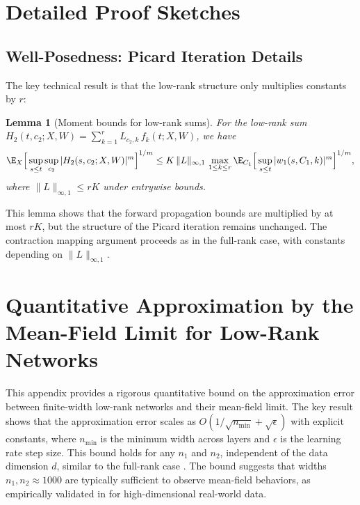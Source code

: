\documentclass[nohyperref]{article}
\theoremstyle{plain}
\newtheorem{lemma}[theorem]{Lemma}
\theoremstyle{definition}
\theoremstyle{remark}
\begin{document}
\section{Detailed Proof Sketches}
\label{app:proofs}


\subsection{Well-Posedness: Picard Iteration Details}
\label{app:picard}


The key technical result is that the low-rank structure only multiplies constants by $r$:

\begin{lemma}[Moment bounds for low-rank sums]
\label{lem:lowrank-moment}
For the low-rank sum $H_2(t,c_2;X,W)=\sum_{k=1}^r L_{c_2,k}\,f_k(t;X,W)$, we have
\[
\E_X\Big[\sup_{s\le t}\sup_{c_2}|H_2(s,c_2;X,W)|^m\Big]^{1/m}
\le K\,\|L\|_{\infty,1}\,\max_{1\le k\le r}\E_{C_1}\Big[\sup_{s\le t}|w_1(s,C_1,k)|^m\Big]^{1/m},
\]
where $\|L\|_{\infty,1}\le rK$ under entrywise bounds.
\end{lemma}

This lemma shows that the forward propagation bounds are multiplied by at most $rK$, but the structure of the Picard iteration remains unchanged. The contraction mapping argument proceeds as in the full-rank case, with constants depending on $\|L\|_{\infty,1}$.








\section{Quantitative Approximation by the Mean-Field Limit for Low-Rank Networks}
\label{app:quantitative}

This appendix provides a rigorous quantitative bound on the approximation error between finite-width low-rank networks and their mean-field limit. The key result shows that the approximation error scales as $O(1/\sqrt{n_{\min}} + \sqrt{\epsilon})$ with explicit constants, where $n_{\min}$ is the minimum width across layers and $\epsilon$ is the learning rate step size. This bound holds for any $n_1$ and $n_2$, independent of the data dimension $d$, similar to the full-rank case \cite{nguyen2020global,nguyen2023rigorousframeworkmeanfield}. The bound suggests that widths $n_1, n_2 \approx 1000$ are typically sufficient to observe mean-field behaviors, as empirically validated in \cite{nguyen2019meanfield} for high-dimensional real-world data.
\end{document}
